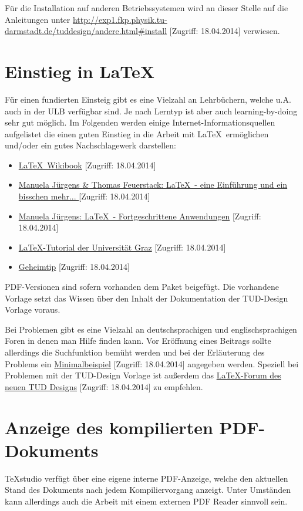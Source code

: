 			\noindent Für die Installation auf anderen Betriebssystemen wird an dieser Stelle auf die Anleitungen unter \url{http://exp1.fkp.physik.tu-darmstadt.de/tuddesign/andere.html#install} [Zugriff: 18.04.2014] verwiesen.
		
	\section{Einstieg in \LaTeX}
		Für einen fundierten Einsteig gibt es eine Vielzahl an Lehrbüchern, welche u.A. auch in der ULB verfügbar sind. Je nach Lerntyp ist aber auch learning-by-doing sehr gut möglich. Im Folgenden werden einige Internet-Informationsquellen aufgelistet die einen guten Einstieg in die Arbeit mit \LaTeX\ ermöglichen und/oder ein gutes Nachschlagewerk darstellen:
		\begin{itemize}
			\item 	\href{http://en.wikibooks.org/wiki/LaTeX}{\LaTeX\ Wikibook} [Zugriff: 18.04.2014]
			\item 	\href{http://www.fernuni-hagen.de/imperia/md/content/zmi_2010/a026_latex_einf.pdf}{Manuela Jürgens \& Thomas Feuerstack: \LaTeX\ - eine Einführung und ein bisschen mehr... } [Zugriff: 18.04.2014]
			\item	\href{ftp://ftp.fernuni-hagen.de/pub/pdf/urz-broschueren/broschueren/a0279510.pdf}{Manuela Jürgens: \LaTeX\ - Fortgeschrittene Anwendungen} [Zugriff: 18.04.2014]
			\item 	\href{http://latex.tugraz.at/latex/tutorial}{\LaTeX-Tutorial der Universität Graz} [Zugriff: 18.04.2014]
			\item 	\href{http://www.gidf.de/}{Geheimtip} [Zugriff: 18.04.2014]
		\end{itemize}
		PDF-Versionen sind sofern vorhanden dem Paket beigefügt. Die vorhandene Vorlage setzt das Wissen über den Inhalt der Dokumentation der TUD-Design Vorlage voraus.
		
		Bei Problemen gibt es eine Vielzahl an deutschsprachigen und englischsprachigen Foren in denen man Hilfe finden kann. Vor Eröffnung eines Beitrags sollte allerdings die Suchfunktion bemüht werden und bei der Erläuterung des Problems ein \href{http://www.golatex.de/wiki/Minimalbeispiel}{Minimalbeispiel} [Zugriff: 18.04.2014] angegeben werden. Speziell bei Problemen mit der TUD-Design Vorlage ist außerdem das \href{http://tuddesign-latex.fs-etit.de/index.php}{LaTeX-Forum des neuen TUD Designs} [Zugriff: 18.04.2014] zu empfehlen.
	
	\section{Anzeige des kompilierten PDF-Dokuments}
		TeXstudio verfügt über eine eigene interne PDF-Anzeige, welche den aktuellen Stand des Dokuments nach jedem Kompiliervorgang anzeigt. Unter Umständen kann allerdings auch die Arbeit mit einem externen PDF Reader sinnvoll sein. 
		
